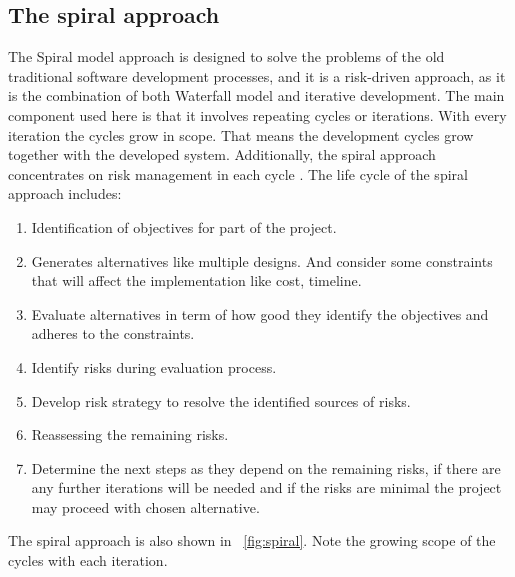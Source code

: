 \documentclass[article,onecolumn]{IEEEtran}
\begin{document}
\subsection{The spiral approach}
The Spiral model approach is designed to solve the problems of the old traditional software development processes, and it is a risk-driven approach, as it is the combination of both Waterfall model and iterative development. The main component used here is that it involves repeating cycles or iterations.
With every iteration the cycles grow in scope. That means the development cycles grow together with the developed system.
Additionally, the spiral approach concentrates on risk management in each cycle \cite{a6}. The life cycle of the spiral approach includes:

\begin{enumerate}
	\item Identification of objectives for part of the project.
	\item Generates alternatives like multiple designs. And consider some constraints that will affect the implementation like cost, timeline.
	\item Evaluate alternatives in term of how good they identify the objectives and adheres to the constraints.
	\item Identify risks during evaluation process.
	\item Develop risk strategy to resolve the identified sources of risks.
	\item Reassessing the remaining risks.
	\item Determine the next steps as they depend on the remaining risks, if there are any further iterations will be needed and if the risks are minimal the project may proceed with chosen alternative.
\end{enumerate}

The spiral approach is also shown in \figurename~\ref{fig:spiral}. Note the growing scope of the cycles with each iteration.
\end{document}
